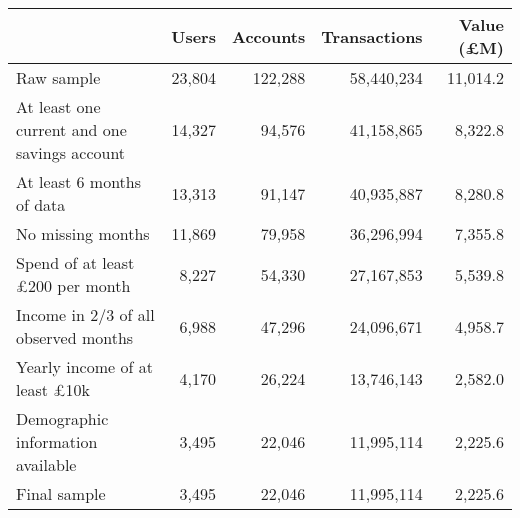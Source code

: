 \begin{tabular}{lrrrr}
\toprule
                                             &  Users & Accounts & Transactions & Value (\pounds M) \\
\midrule
                                  Raw sample & 23,804 &  122,288 &   58,440,234 &          11,014.2 \\
At least one current and one savings account & 14,327 &   94,576 &   41,158,865 &           8,322.8 \\
                   At least 6 months of data & 13,313 &   91,147 &   40,935,887 &           8,280.8 \\
                           No missing months & 11,869 &   79,958 &   36,296,994 &           7,355.8 \\
            Spend of at least £200 per month &  8,227 &   54,330 &   27,167,853 &           5,539.8 \\
        Income in 2/3 of all observed months &  6,988 &   47,296 &   24,096,671 &           4,958.7 \\
        Yearly income of at least \pounds10k &  4,170 &   26,224 &   13,746,143 &           2,582.0 \\
           Demographic information available &  3,495 &   22,046 &   11,995,114 &           2,225.6 \\
                                Final sample &  3,495 &   22,046 &   11,995,114 &           2,225.6 \\
\bottomrule
\end{tabular}
